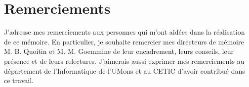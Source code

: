 \chapter*{Remerciements}

J'adresse mes remerciements aux personnes qui m'ont aidées dans la réalisation de ce mémoire.
En particulier, je souhaite remercier mes directeurs de mémoire M. B. Quoitin et M. M. Goemmine de leur
encadrement, leurs conseils,  leur présence et  de leurs relectures. J'aimerais aussi  exprimer mes remerciements au département de l'Informatique de l'UMons  et au CETIC  d'avoir contribué dans ce travail.


